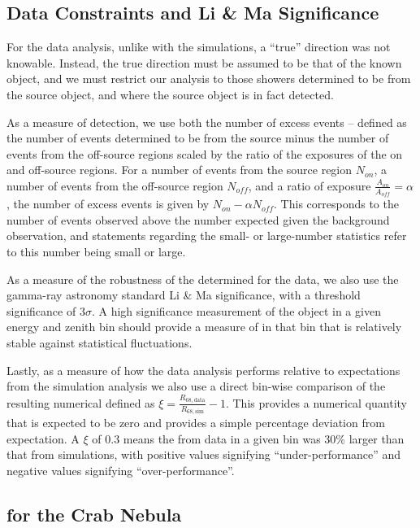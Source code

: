 \documentclass[main.tex]{subfiles}
\begin{document}
\subsection{Data Constraints and Li \& Ma Significance}
\label{li_ma_defn}
For the data analysis, unlike with the simulations, a ``true'' direction was not knowable. Instead, the true direction must be assumed to be that of the known object, and we must restrict our analysis to those showers determined to be from the source object, and where the source object is in fact detected.

As a measure of detection, we use both the number of excess events -- defined as the number of events determined to be from the source minus the number of events from the off-source regions scaled by the ratio of the exposures of the on and off-source regions. For a number of events from the source region $N_{on}$, a number of events from the off-source region $N_{off}$, and a ratio of exposure $\frac{A_{on}}{A_{off}}=\alpha$, the number of excess events is given by $N_{on}-\alpha N_{off}$. This corresponds to the number of events observed above the number expected given the background observation, and statements regarding the small- or large-number statistics refer to this number being small or large.

As a measure of the robustness of the \rse determined for the data, we also use the gamma-ray astronomy standard Li \& Ma\cite{LiMa} significance, with a threshold significance of $3\sigma$. A high significance measurement of the object in a given energy and zenith bin should provide a measure of \rse in that bin that is relatively stable against statistical fluctuations.

Lastly, as a measure of how the data analysis performs relative to expectations from the simulation analysis we also use a direct bin-wise comparison of the resulting numerical \rse defined as $\xi = \frac{R_{68, \text{data}}}{R_{68, \text{sim}}}-1$. This provides a numerical quantity that is expected to be zero and provides a simple percentage deviation from expectation. A $\xi$ of $0.3$ means the \rse from data in a given bin was 30\% larger than that from simulations, with positive values signifying ``under-performance'' and negative values signifying ``over-performance''.

\subsection{\rse for the Crab Nebula}
\end{document}

